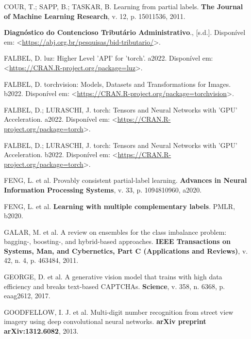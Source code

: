 \documentclass[12pt,twoside,brazilian]{book}
\newlength{\cslhangindent}
\newlength{\cslentryspacingunit} %
\newenvironment{CSLReferences}[2] %
 {%
  \setlength{\parindent}{0pt}
  \ifodd #1
  \let\oldpar\par
  \def\par{\hangindent=\cslhangindent\oldpar}
  \fi
  \setlength{\parskip}{#2\cslentryspacingunit}
 }%
 {}
\begin{document}
\begin{CSLReferences}{0}{1}
\leavevmode{}%
COUR, T.; SAPP, B.; TASKAR, B. Learning from partial labels. \textbf{The
Journal of Machine Learning Research}, v. 12, p. 15011536, 2011.

\leavevmode{}%
\textbf{Diagnóstico do Contencioso Tributário Administrativo}.,
{[}s.d.{]}. Disponível em:
\textless{}\url{https://abj.org.br/pesquisas/bid-tributario/}\textgreater.

\leavevmode{}%
FALBEL, D. luz: Higher Level 'API' for 'torch'. a2022. Disponível em:
\textless{}\url{https://CRAN.R-project.org/package=luz}\textgreater.

\leavevmode{}%
FALBEL, D. torchvision: Models, Datasets and Transformations for Images.
b2022. Disponível em:
\textless{}\url{https://CRAN.R-project.org/package=torchvision}\textgreater.

\leavevmode{}%
FALBEL, D.; LURASCHI, J. torch: Tensors and Neural Networks with 'GPU'
Acceleration. a2022. Disponível em:
\textless{}\url{https://CRAN.R-project.org/package=torch}\textgreater.

\leavevmode{}%
FALBEL, D.; LURASCHI, J. torch: Tensors and Neural Networks with 'GPU'
Acceleration. b2022. Disponível em:
\textless{}\url{https://CRAN.R-project.org/package=torch}\textgreater.

\leavevmode{}%
FENG, L. et al. Provably consistent partial-label learning.
\textbf{Advances in Neural Information Processing Systems}, v. 33, p.
1094810960, a2020.

\leavevmode{}%
FENG, L. et al. \textbf{Learning with multiple complementary labels}.
PMLR, b2020.

\leavevmode{}%
GALAR, M. et al. A review on ensembles for the class imbalance problem:
bagging-, boosting-, and hybrid-based approaches. \textbf{IEEE
Transactions on Systems, Man, and Cybernetics, Part C (Applications and
Reviews)}, v. 42, n. 4, p. 463484, 2011.

\leavevmode{}%
GEORGE, D. et al. A generative vision model that trains with high data
efficiency and breaks text-based CAPTCHAs. \textbf{Science}, v. 358, n.
6368, p. eaag2612, 2017.

\leavevmode{}%
GOODFELLOW, I. J. et al. Multi-digit number recognition from street view
imagery using deep convolutional neural networks. \textbf{arXiv preprint
arXiv:1312.6082}, 2013.


\end{CSLReferences}
\end{document}
